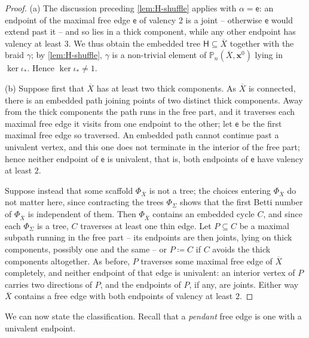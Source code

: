 \documentclass[reqno]{amsart}
\theoremstyle{definition}
\newcommand\bfx{\mathbf{x}}
\newcommand\sfH{\mathsf{H}}
\newcommand\sfe{\mathsf{e}}
\newcommand{\PB}{\mathbb{P}}
\newcommand{\base}{\bfx^0}
\renewcommand{\bar}{\overline}
\numberwithin{equation}{section}
\begin{document}
\begin{proof}
(a) The discussion preceding \cref{lem:H-shuffle} applies with
\(\alpha=\sfe\): an endpoint of the maximal free edge \(\sfe\) of
valency \(2\) is a joint -- otherwise \(\sfe\) would extend past it
-- and so lies in a thick component, while any other endpoint
has valency at least \(3\). We thus obtain the embedded tree
\(\sfH\subseteq\bar X\) together with the braid \(\gamma\); by
\cref{lem:H-shuffle}, \(\gamma\) is a non-trivial element of
\(\PB_n(\bar X,\base)\) lying in \(\ker\iota_\ast\). Hence
\(\ker\iota_\ast\neq1\).

(b) Suppose first that \(\bar X\) has at least two thick
components. As \(\bar X\) is connected, there is an embedded
path joining points of two distinct thick components. Away from
the thick components the path runs in the free part, and it
traverses each maximal free edge it visits from one endpoint to
the other; let \(\sfe\) be the first maximal free edge so
traversed. An embedded path cannot continue past a univalent
vertex, and this one does not terminate in the interior of the
free part; hence neither endpoint of \(\sfe\) is univalent, that
is, both endpoints of \(\sfe\) have valency at least \(2\).

Suppose instead that some scaffold \(\Phi_{\bar X}\) is not a
tree; the choices entering \(\Phi_{\bar X}\) do not matter here,
since contracting the trees \(\Phi_\Sigma\) shows that the first
Betti number of \(\Phi_{\bar X}\) is independent of them. Then
\(\Phi_{\bar X}\) contains an embedded cycle \(C\), and since
each \(\Phi_\Sigma\) is a tree, \(C\) traverses at least one
thin edge. Let \(P\subseteq C\) be a maximal subpath running in
the free part -- its endpoints are then joints, lying on thick
components, possibly one and the same -- or \(P\coloneqq C\) if
\(C\) avoids the thick components altogether. As before, \(P\)
traverses some maximal free edge of \(\bar X\) completely, and
neither endpoint of that edge is univalent: an interior vertex
of \(P\) carries two directions of \(P\), and the endpoints of
\(P\), if any, are joints. Either way \(\bar X\) contains a free
edge with both endpoints of valency at least \(2\).
\end{proof}

We can now state the classification. Recall that a \emph{pendant}
free edge is one with a univalent endpoint.
\end{document}
